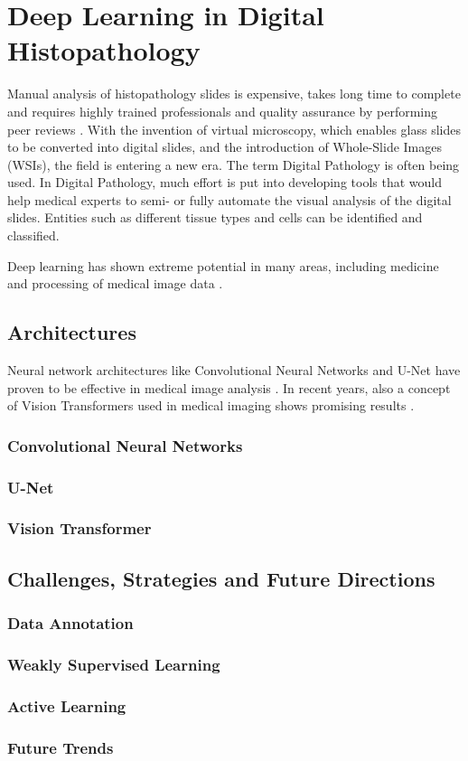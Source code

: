 \chapter{Deep Learning in Digital Histopathology}
Manual analysis of histopathology slides is expensive, takes long time to complete and requires highly trained professionals and quality assurance by performing peer reviews \cite{Wemmert2021}. With the invention of virtual microscopy, which enables glass slides to be converted into digital slides, and the introduction of Whole-Slide Images (WSIs), the field is entering a new era. The term Digital Pathology is often being used. In Digital Pathology, much effort is put into developing tools that would help medical experts to semi- or fully automate the visual analysis of the digital slides. Entities such as different tissue types and cells can be identified and classified.

Deep learning has shown extreme potential in many areas, including medicine and processing of medical image data \cite{LeCun2015}.

\section{Architectures}
Neural network architectures like Convolutional Neural Networks \cite{LeCun2015-2} and U-Net \cite{Ronneberger2015} have proven to be effective in medical image analysis \cite{Santosh2022-2}. In recent years, also a concept of Vision Transformers \cite{Dosovitskiy2020, Hu2023} used in medical imaging shows promising results \cite{Shamshad2023, Hu2023, He2023}.

\subsection{Convolutional Neural Networks}

\subsection{U-Net}

\subsection{Vision Transformer}

\section{Challenges, Strategies and Future Directions}

\subsection{Data Annotation}

\subsection{Weakly Supervised Learning}

\subsection{Active Learning}

\subsection{Future Trends}

